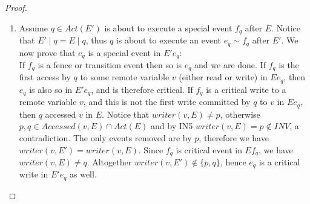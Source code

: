 \begin{proof}
\begin{enumerate}
\item
	Assume $q \in Act(E')$ is about to execute a special event $f_q$ after $E$. Notice that $E' \mid q = E \mid q$, thus $q$ is about to execute an event $e_q \sim f_q$ after $E'$. We now prove that $e_q$ is a special event in $E' e_q$:
	\\ If $f_q$ is a fence or transition event then so is $e_q$ and we are done. If $f_q$ is the first access by $q$ to some remote variable $v$ (either read or write) in $E e_q$, then $e_q$ is also so in $E' e_q$, and is therefore critical. If $f_q$ is a critical write to a remote variable $v$, and this is not the first write committed by $q$ to $v$ in $E e_q$, then $q$ accessed $v$ in $E$. Notice that $writer(v,E) \neq p$, otherwise $p,q \in Accessed(v,E) \cap Act(E)$ and by IN5 $writer(v,E) = p \notin INV$, a contradiction. The only events removed are by $p$, therefore we have $writer(v,E') = writer(v,E)$. Since $f_q$ is critical event in $E f_q$, we have $writer(v,E) \neq q$. Altogether $writer(v,E') \notin \{p,q\}$, hence $e_q$ is a critical write in $E' e_q$ as well.
\end{enumerate}	


\end{proof}
